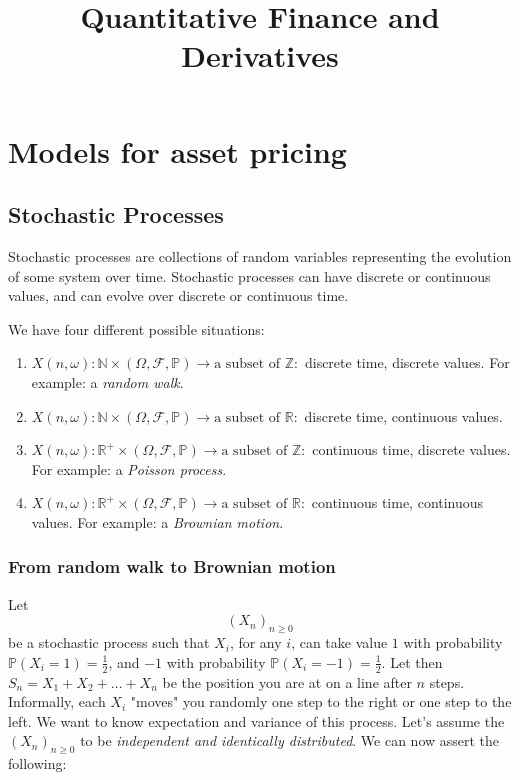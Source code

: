 \documentclass[oneside,titlepage,headinclude,12pt,a4paper,BCOR5mm,footinclude]{book}
\title{Quantitative Finance and Derivatives}
\theoremstyle{defn}
\begin{document}
\maketitle
\tableofcontents

\chapter{Models for asset pricing}

\section{Stochastic Processes}

Stochastic  processes are  collections  of random  variables representing  the
evolution of some system over time.  Stochastic processes can have discrete or
continuous values, and can evolve over discrete or continuous time.

We have four different possible situations:
\begin{enumerate}
  \item \(X(n,\omega) : \mathbb{N} \times (\Omega,\mathcal{F},\mathbb{P}) \to \text{a subset of } \mathbb{Z}:\) discrete time, discrete values. For example: a \textit{random walk}.
  \item \(X(n,\omega) : \mathbb{N} \times (\Omega,\mathcal{F},\mathbb{P}) \to \text{a subset of } \mathbb{R}:\) discrete time, continuous values.
  \item \(X(n,\omega) : \mathbb{R}^+ \times (\Omega,\mathcal{F},\mathbb{P}) \to \text{a subset of } \mathbb{Z}:\) continuous time, discrete values. For example: a \textit{Poisson process}.
  \item \(X(n,\omega) : \mathbb{R}^+ \times (\Omega,\mathcal{F},\mathbb{P}) \to \text{a subset of } \mathbb{R}:\) continuous time, continuous values. For example: a \textit{Brownian motion}.
\end{enumerate}

\subsection{From random walk to Brownian motion}

Let   $$(X_n)_{n   \geq    0}$$   be   a   stochastic    process   such   that
\(X_i\),   for   any   \(i\),   can  take   value   \(1\)   with   probability
\(\mathbb{P}(X_i=1)=\frac{1}{2}\),     and     \(-1\)     with     probability
\(\mathbb{P}(X_i=-1)=\frac{1}{2}\). Let then \(S_n = X_1 + X_2 + \ldots +X_n\)
be the  position you  are at  on a  line after  \(n\) steps.  Informally, each
\(X_i\) "moves" you randomly one step to the right or one step to the left. We
want  to know  expectation  and variance  of this  process.  Let's assume  the
\((X_n)_{n \geq  0}\) to be \textit{independent  and identically distributed}.
We can now assert the following:
\end{document}
